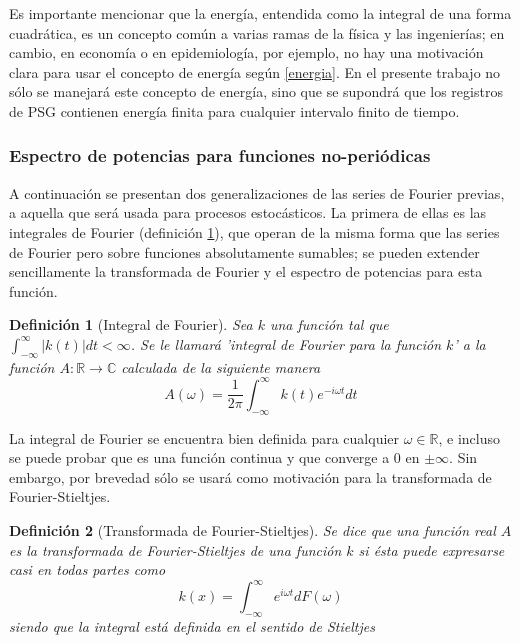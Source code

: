 \documentclass[12pt,a4paper]{mitthesis}
\newtheorem{defn}{Definici\'on}
\newcommand{\intR}{\int_{-\infty}^{\infty}}
\newcommand{\abso}[1]{\left| #1 \right|}
\begin{document}
Es importante mencionar que la energ\'ia, entendida como la integral de una forma cuadr\'atica, es 
un concepto com\'un a varias ramas de la f\'isica y las ingenier\'ias; en cambio, en econom\'ia o 
en epidemiolog\'ia, por ejemplo, no hay una motivaci\'on clara para usar el concepto de energ\'ia 
seg\'un \ref{energia}.
En el presente trabajo no s\'olo se manejar\'a este concepto de energ\'ia, sino que se supondr\'a
que los registros de PSG contienen energ\'ia finita para cualquier intervalo finito de tiempo.


\subsubsection{Espectro de potencias para funciones no-peri\'odicas}

A continuaci\'on se presentan dos generalizaciones de las series de Fourier previas, a aquella que
ser\'a usada para procesos estoc\'asticos. La primera de ellas es las integrales de Fourier
(definici\'on \ref{fourier_int}), que operan de la misma forma que las series de Fourier pero
sobre funciones absolutamente sumables; se pueden extender sencillamente la transformada de Fourier 
y el espectro de potencias para esta funci\'on.

\begin{defn}[Integral de Fourier]
Sea $k$ una funci\'on tal que $\intR \abso{k(t)} dt < \infty$. Se le llamar\'a 'integral de 
Fourier para la funci\'on $k$' a la funci\'on $A:\mathbb{R}\rightarrow \mathbb{C}$ calculada de la 
siguiente manera
\begin{equation*}
A(\omega) = \frac{1}{2 \pi} \intR k(t) e^{- i \omega t} dt
\end{equation*}
\label{fourier_int}
\end{defn}

La integral de Fourier  se encuentra bien definida para cualquier $\omega \in \mathbb{R}$, e 
incluso se puede probar que es una funci\'on continua y que converge a 0 en $\pm \infty$.
Sin embargo, por brevedad s\'olo se usar\'a como motivaci\'on para la transformada de 
Fourier-Stieltjes.

\begin{defn}[Transformada de Fourier-Stieltjes]
Se dice que una funci\'on real $A$ es la transformada de Fourier-Stieltjes de una funci\'on $k$ si 
\'esta puede expresarse casi en todas partes como
\begin{equation*}
k(x) = \intR e^{ i \omega t} dF(\omega)
\end{equation*}
siendo que la integral est\'a definida en el sentido de Stieltjes
\label{fourier_stieltjes}
\end{defn}
\end{document}
